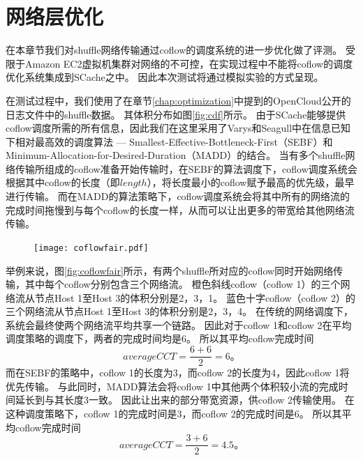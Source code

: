 \section{网络层优化}

在本章节我们对shuffle网络传输通过coflow的调度系统的进一步优化做了评测。
受限于Amazon EC2虚拟机集群对网络的不可控，在实现过程中不能将coflow的调度优化系统集成到SCache之中。
因此本次测试将通过模拟实验的方式呈现。

在测试过程中，我们使用了在章节\ref{chap:optimization}中提到的OpenCloud公开的日志文件中的shuffle数据。
其体积分布如图\ref{fig:cdf}所示。
由于SCache能够提供coflow调度所需的所有信息，因此我们在这里采用了Varys\cite{varys}和Seagull\cite{seagull}中在信息已知下相对最高效的调度算法 ---
Smallest-Effective-Bottleneck-First（SEBF）和Minimum-Allocation-for-Desired-Duration（MADD）的结合。
当有多个shuffle网络传输所组成的coflow准备开始传输时，在SEBF的算法调度下，coflow调度系统会根据其中coflow的长度（即$length$），将长度最小的coflow赋予最高的优先级，最早进行传输。
而在MADD的算法策略下，coflow调度系统会将其中所有的网络流的完成时间拖慢到与每个coflow的长度一样，从而可以让出更多的带宽给其他网络流传输。

\begin{figure}[!htp]
	\centering
	\texttt{[image: coflowfair.pdf]}
\end{figure}

举例来说，图\ref{fig:coflowfair}所示，有两个shuffle所对应的coflow同时开始网络传输，其中每个coflow分别包含三个网络流。
橙色斜线coflow（coflow 1）的三个网络流从节点Host 1至Host 3的体积分别是2，3，1。
蓝色十字coflow（coflow 2）的三个网络流从节点Host 1至Host 3的体积分别是2，3，4。
在传统的网络调度下，系统会最终使两个网络流平均共享一个链路。
因此对于coflow 1和coflow 2在平均调度策略的调度下，两者的完成时间均是6。
所以其平均coflow完成时间
\begin{equation}
    average CCT = \frac{6 + 6}{2} = 6。
\end{equation}
而在SEBF的策略中，coflow 1的长度为3，而coflow 2的长度为4，因此coflow 1将优先传输。
与此同时，MADD算法会将coflow 1中其他两个体积较小流的完成时间延长到与其长度3一致。
因此让出来的部分带宽资源，供coflow 2传输使用。
在这种调度策略下，coflow 1的完成时间是3，而coflow 2的完成时间是6。
所以其平均coflow完成时间
\begin{equation}
    average CCT = \frac{3 + 6}{2} = 4.5。
\end{equation}

